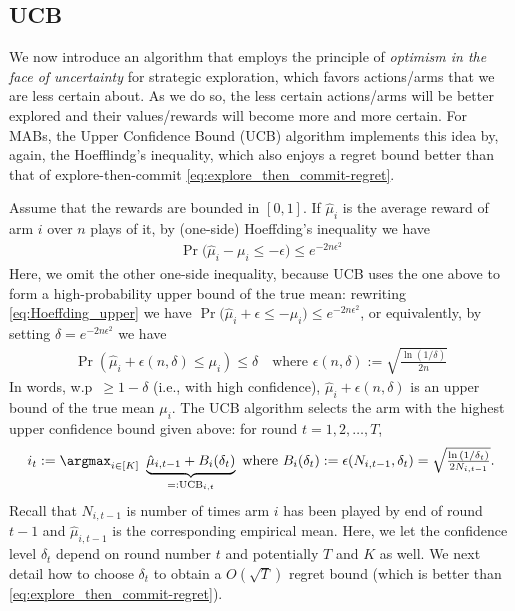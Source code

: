 \subsection{UCB}
We now introduce an algorithm that employs the principle of {\em optimism in the face of uncertainty} for strategic exploration, which favors actions/arms that we are less certain about.
As we do so, the less certain actions/arms will be better explored and their values/rewards will become more and more certain.
For MABs, the Upper Confidence Bound (UCB) algorithm implements this idea by, again, the Hoefflindg's inequality, which also enjoys a regret bound better than that of explore-then-commit \eqref{eq:explore_then_commit-regret}.

Assume that the rewards are bounded in $[0,1]$.
If $\hat{\mu}_{i}$ is the average reward of arm $i$ over $n$ plays of it, by (one-side) Hoeffding's inequality we have
\begin{align}
\label{eq:Hoeffding_upper}
    \Pr\big(\hat{\mu}_i-\mu_i \leq -\epsilon\big) \leq e^{-2 n \epsilon^2}
\end{align}
Here, we omit the other one-side inequality, because UCB uses the one above to form a high-probability upper bound of the true mean: rewriting \eqref{eq:Hoeffding_upper} we have $\Pr\big(\hat{\mu}_i+ \epsilon \leq -\mu_i \big) \leq e^{-2 n \epsilon^2}$, or equivalently, by setting $\delta=e^{-2 n \epsilon^2}$ we have
\begin{align}
\label{eq:upper_confidence_bound}
    \Pr\left(\hat{\mu}_i+ \epsilon(n,\delta) \leq \mu_i \right) \leq \delta \quad \text{where } \epsilon(n,\delta):=\sqrt{\tfrac{\ln{(1/\delta)}}{2n}}
\end{align}
In words, w.p~$\geq 1-\delta$ (i.e., with high confidence),  $\hat{\mu}_i+ \epsilon(n,\delta)$ is an upper bound of the true mean $\mu_i$.
The UCB algorithm selects the arm with the highest upper confidence bound given above: for round $t=1,2,\ldots,T$,
\begin{align}
\label{eq:UCB}
   i_t:=\argmax_{i \in[K]}~ \underbrace{\hat{\mu}_{i, t-1}+B_i(\delta_t)}_{=:{\rm UCB}_{i, t}} \text{ where }
   B_i(\delta_t):= \epsilon(N_{i,t-1}, \delta_t) = \sqrt{\tfrac{\ln{(1/\delta_t)}}{2N_{i,t-1}}}
   .
\end{align}
Recall that $N_{i,t-1}$ is number of times arm $i$ has been played by end of round $t-1$ and $\hat{\mu}_{i,t-1}$ is the corresponding empirical mean.
Here, we let the confidence level $\delta_t$ depend on round number $t$ and potentially $T$ and $K$ as well.
We next detail how to choose $\delta_t$ to obtain a $O(\sqrt{T})$ regret bound (which is better than \eqref{eq:explore_then_commit-regret}).

